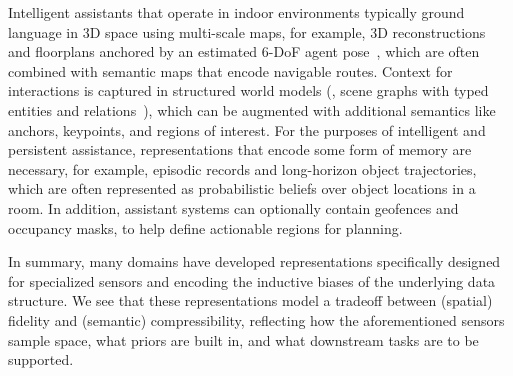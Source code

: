 Intelligent assistants that operate in indoor environments typically ground language in 3D space using multi-scale maps, for example, 3D reconstructions and floorplans anchored by an estimated 6-DoF agent pose~\cite{savva2019habitat, straub2019replica, chang2017matterport3d}, which are often combined with semantic maps that encode navigable routes. 
Context for interactions is captured in structured world models (\eg, scene graphs with typed entities and relations~\cite{armeni20193dsg, wald2020learning, wu2021scenegraphfusion}), which can be augmented with additional semantics like anchors, keypoints, and regions of interest. 
For the purposes of intelligent and persistent assistance, representations that encode some form of memory are necessary, for example, episodic records and long-horizon object trajectories, which are often represented as probabilistic beliefs over object locations in a room. 
In addition, assistant systems can optionally contain geofences and occupancy masks, to help define actionable regions for planning. 

In summary, many domains have developed representations specifically designed for specialized sensors and encoding the inductive biases of the underlying data structure. 
We see that these representations model a tradeoff between (spatial) fidelity and (semantic) compressibility, reflecting how the aforementioned sensors sample space, what priors are built in, and what downstream tasks are to be supported. 


